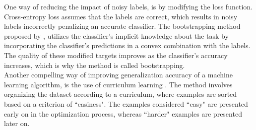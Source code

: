 One way of reducing the impact of noisy labels, is by modifying the loss function. Cross-entropy loss assumes that the labels are correct, which results in noisy labels incorrectly penalizing an accurate classifier. The bootstrapping method proposed by \citep{Reed_noisy_labels_bootstrapping}, utilizes the classifier's implicit knowledge about the task by incorporating the classifier’s predictions in a convex combination with the labels. The quality of these modified targets improves as the classifier's accuracy increases, which is why the method is called bootstrapping.\\

Another compelling way of improving generalization accuracy of a machine learning algorithm, is the use of curriculum learning \citep{Bengio_curriculumlearning}. The method involves organizing the dataset according to a curriculum, where examples are sorted based on a criterion of ``easiness". The examples considered ``easy" are presented early on in the optimization process, whereas ``harder" examples are presented later on.
